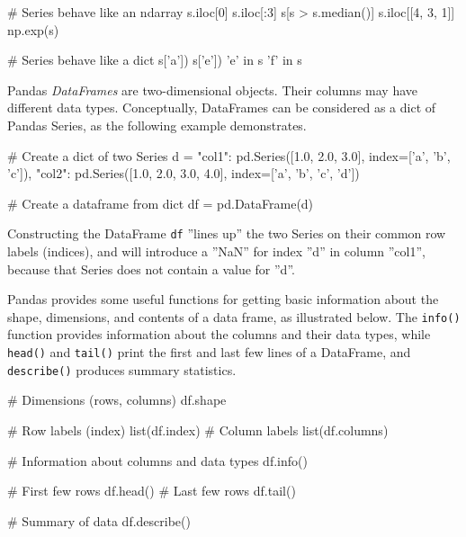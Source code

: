 \begin{pythoncode}
# Series behave like an ndarray
s.iloc[0]
s.iloc[:3]
s[s > s.median()]
s.iloc[[4, 3, 1]]
np.exp(s)

# Series behave like a dict
s['a'])
s['e'])
'e' in s
'f' in s
\end{pythoncode}

Pandas \emph{DataFrames} are two-dimensional objects. Their columns may have different data types. Conceptually, DataFrames can be considered as a dict of Pandas Series, as the following example demonstrates. 

\begin{pythoncode}
# Create a dict of two Series
d = {
    "col1": pd.Series([1.0, 2.0, 3.0], 
                index=['a', 'b', 'c']),
    "col2": pd.Series([1.0, 2.0, 3.0, 4.0], 
                index=['a', 'b', 'c', 'd'])
}

# Create a dataframe from dict
df = pd.DataFrame(d)
\end{pythoncode}

Constructing the DataFrame \texttt{df} ''lines up'' the two Series on their common row labels (indices), and will introduce a ''NaN'' for index ''d'' in column ''col1'', because that Series does not contain a value for ''d''.

Pandas provides some useful functions for getting basic information about the shape, dimensions, and contents of a data frame, as illustrated below. The \texttt{info()} function provides information about the columns and their data types, while \texttt{head()} and \texttt{tail()} print the first and last few lines of a DataFrame, and \texttt{describe()} produces summary statistics.

\begin{pythoncode}
# Dimensions (rows, columns)
df.shape

# Row labels (index)
list(df.index)
# Column labels
list(df.columns)

# Information about columns and data types
df.info()

# First few rows
df.head()
# Last few rows
df.tail()

# Summary of data
df.describe()
\end{pythoncode}


